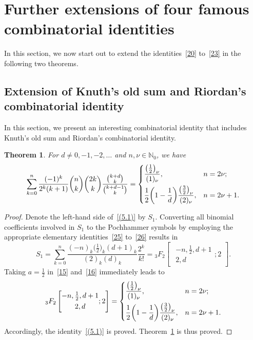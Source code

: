 \documentclass[reqno]{amsart}
\numberwithin{equation}{section}
\theoremstyle{plain}
\newtheorem{thm}{Theorem}[section]
\theoremstyle{remark}
\begin{document}
\section{Further extensions of four famous combinatorial identities}\label{section5}

In this section, we now start out to extend the identities~\eqref{20} to~\eqref{23} in the following two theorems.

\subsection{Extension of Knuth's old sum and Riordan's combinatorial identity}

In this section, we present an interesting combinatorial identity that includes Knuth's old sum and Riordan's combinatorial identity.

\begin{thm}\label{5.1thm}
For $d \neq 0,-1,-2,\dotsc$ and $n,\nu \in \mathbb{N}_0$, we have
\begin{equation}\label{(5.1)}
\sum_{k=0}^{n}\frac{(-1)^k}{2^k(k+1)}
\binom{n}{k}\binom{2k}{k}
\frac{\binom{k+d}{k}}{\binom{k+d-1}{k}}
=
\begin{dcases}
\frac{\bigl(\frac12\bigr)_\nu}{(1)_\nu}, & n=2\nu; \\
\frac12\biggl(1-\frac{1}{d}\biggr)
\frac{\bigl(\frac32\bigr)_\nu}{(2)_\nu}, & n=2\nu+1.
\end{dcases}
\end{equation}
\end{thm}

\begin{proof}
Denote the left-hand side of~\eqref{(5.1)} by $S_1$. Converting all binomial coefficients involved in $S_1$ to the Pochhammer symbols by employing the appropriate elementary identities~\eqref{25} to~\eqref{26} results in
\[
S_1
= \sum_{k=0}^{n}
\frac{(-n)_k\bigl(\frac12\bigr)_k(d+1)_k}{(2)_k(d)_k}\frac{2^k}{k!}
= {}_3F_2
\begin{bmatrix}
\begin{gathered}-n,\tfrac12,d+1 \\
2,d\end{gathered}; 2
\end{bmatrix}.
\]
Taking $a=\frac12$ in~\eqref{15} and~\eqref{16} immediately leads to
\[
{}_3F_2\begin{bmatrix}\begin{gathered}-n, \tfrac{1}{2}, d+1\\
2,d\end{gathered};2\end{bmatrix}
=
\begin{dcases}
\frac{\bigl(\frac12\bigr)_\nu}{(1)_\nu}, & n=2\nu; \\
\frac12\biggl(1-\frac{1}{d}\biggr)
\frac{\bigl(\frac32\bigr)_\nu}{(2)_\nu}, & n=2\nu+1.
\end{dcases}
\]
Accordingly, the identity~\eqref{(5.1)} is proved. Theorem~\ref{5.1thm} is thus proved.
\end{proof}
\end{document}
